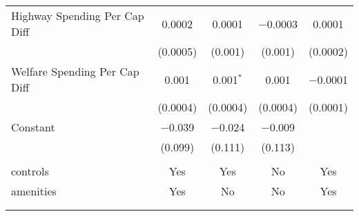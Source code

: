 \begin{table}[!htbp]
\begin{tabular}{@{\extracolsep{5pt}}lcccc}
  Highway Spending Per Cap Diff & 0.0002 & 0.0001 & $-$0.0003 & 0.0001 \\ 
  & (0.0005) & (0.001) & (0.001) & (0.0002) \\ 
  Welfare Spending Per Cap Diff & 0.001 & 0.001$^{*}$ & 0.001 & $-$0.0001 \\ 
  & (0.0004) & (0.0004) & (0.0004) & (0.0001) \\ 
  Constant & $-$0.039 & $-$0.024 & $-$0.009 &  \\ 
  & (0.099) & (0.111) & (0.113) &  \\ 
 \hline \\[-1.8ex] 
controls & Yes & Yes & No & Yes \\ 
amenities & Yes & No & No & Yes \\ 
\hline \\[-1.8ex] 
\hline 
\hline \\[-1.8ex] 
\end{tabular} 
\end{table} 
